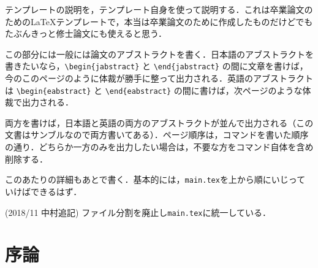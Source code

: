 \begin{jabstract}

テンプレートの説明を，テンプレート自身を使って説明する．これは卒業論文のための\LaTeX テンプレートで，本当は卒業論文のために作成したものだけどでもたぶんきっと修士論文にも使えると思う．

この部分には一般には論文のアブストラクトを書く．日本語のアブストラクトを書きたいなら，\verb|\begin{jabstract}| と \verb|\end{jabstract}| の間に文章を書けば，今のこのページのように体裁が勝手に整って出力される．英語のアブストラクトは \verb|\begin{eabstract}| と \verb|\end{eabstract}| の間に書けば，次ページのような体裁で出力される．

両方を書けば，日本語と英語の両方のアブストラクトが並んで出力される（この文書はサンブルなので両方書いてある）．ページ順序は，コマンドを書いた順序の通り．どちらか一方のみを出力したい場合は，不要な方をコマンド自体を含め削除する．

このあたりの詳細もあとで書く．基本的には，{\tt main.tex}を上から順にいじっていけばできるはず．

(2018/11 中村追記) ファイル分割を廃止し{\tt main.tex}に統一している．

\end{jabstract}

\tableofcontents	%
\listoffigures		%
\listoftables		%


\chapter{序論}

